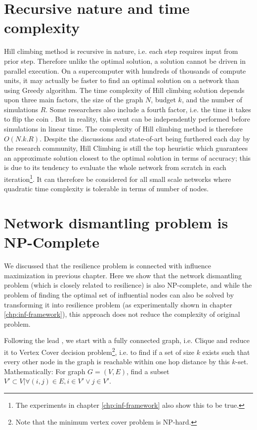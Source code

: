 	\section{Recursive nature and time complexity}
	\label{sec:proof-time-complexity}
	Hill climbing method is recursive in nature, i.e. each step requires input from prior step. Therefore unlike the optimal solution, a solution cannot be driven in parallel execution. On a supercomputer with hundreds of thousands of compute units, it may actually be faster to find an optimal solution on a network than using Greedy algorithm. The time complexity of Hill climbing solution depends upon three main factors, the size of the graph $N$, budget $k$, and the number of simulations $R$. Some researchers also include a fourth factor, i.e. the time it takes to flip the coin \cite{kempe2005}. But in reality, this event can be independently performed before simulations in linear time. The complexity of Hill climbing method is therefore $O(N.k.R)$. Despite the discussions and state-of-art being furthered each day by the research community, Hill Climbing is still the top heuristic which guarantees an approximate solution closest to the optimal solution in terms of accuracy; this is due to its tendency to evaluate the whole network from scratch in each iteration\footnote{The experiments in chapter \ref{chp:inf-framework} also show this to be true.}. It can therefore be considered for all small scale networks where quadratic time complexity is tolerable in terms of number of nodes.
	
	
	\section{Network dismantling problem is NP-Complete}
	\label{sec:proof-resilience}
	We discussed that the resilience problem is connected with influence maximization in previous chapter. Here we show that the network dismantling problem (which is closely related to resilience) is also NP-complete, and while the problem of finding the optimal set of influential nodes can also be solved by transforming it into resilience problem (as experimentally shown in chapter \ref{chp:inf-framework}), this approach does not reduce the complexity of original problem.
	
	Following the lead \cite{braunstein2016}, we start with a fully connected graph, i.e. Clique and reduce it to Vertex Cover decision problem\footnote{Note that the minimum vertex cover problem is NP-hard.}, i.e. to find if a set of size $k$ exists such that every other node in the graph is reachable within one hop distance by this $k$-set. Mathematically:
	For graph $G=(V,E)$, find a subset $V'\subset V|\forall (i,j)\in E, i\in V' \vee j\in V'$.
	
